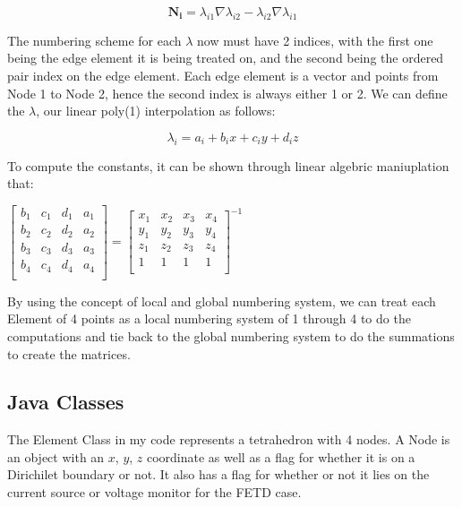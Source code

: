 \documentclass[11pt,a4paper,oldfontcommands]{memoir}
\begin{document}
\begin{equation} \label{eq:6}
\mathbf{N_i} = \lambda_{i1} \nabla \lambda_{i2} - \lambda_{i2} \nabla \lambda_{i1}
\end{equation}

The numbering scheme for each $\lambda$ now must have 2 indices, with the first one being the edge element it is being treated on, and the second being the ordered pair index on the edge element. Each edge element is a vector and points from Node 1 to Node 2, hence the second index is always either 1 or 2. We can define the $\lambda$, our linear poly(1) interpolation as follows:

\begin{equation} \label{eq:7}
\lambda_{i} = a_i + b_i x + c_i y + d_i z
\end{equation}

To compute the constants, it can be shown through linear algebric maniuplation that:

$\begin{bmatrix}
       b_1 & c_1 & d_1 & a_1 \\ 
       b_2 & c_2 & d_2 & a_2 \\ 
       b_3 & c_3 & d_3 & a_3 \\ 
       b_4 & c_4 & d_4 & a_4 \\ 
\end{bmatrix}
= \begin{bmatrix}
       x_1 & x_2 & x_3 & x_4 \\ 
       y_1 & y_2 & y_3 & y_4 \\ 
       z_1 & z_2 & z_3 & z_4 \\ 
       1 & 1& 1 & 1 \\ 
\end{bmatrix}^{-1}$

By using the concept of local and global numbering system, we can treat each Element of 4 points as a local numbering system of 1 through 4 to do the computations and tie back to the global numbering system to do the summations to create the matrices.

\subsection{Java Classes}

The Element Class in my code represents a tetrahedron with 4 nodes. A Node is an object with an $x$, $y$, $z$ coordinate as well as a flag for whether it is on a Dirichilet boundary or not. It also has a flag for whether or not it lies on the current source or voltage monitor for the FETD case.
\end{document}
